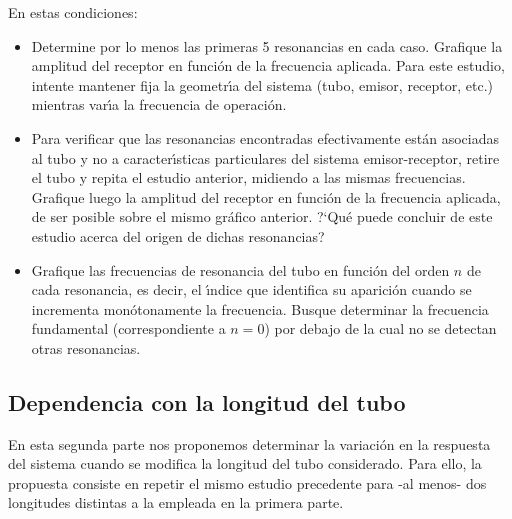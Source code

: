 \documentclass[laboratorio]{guia}
\begin{document}
En estas condiciones:
\begin{itemize}
    \item Determine por lo menos las primeras 5 resonancias en cada caso.
        Grafique la amplitud del receptor en funci\'on de la frecuencia
        aplicada. Para este estudio, intente mantener fija la geometr\'\i a del
        sistema (tubo, emisor, receptor, etc.) mientras var\'\i a la frecuencia
        de operaci\'on.
    \item Para verificar que las resonancias encontradas efectivamente est\'an
        asociadas al tubo y no a caracter\'\i sticas particulares del sistema
        emisor-receptor, retire el tubo y repita el estudio anterior, midiendo
        a las mismas frecuencias. Grafique luego la amplitud del receptor en
        funci\'on de la frecuencia aplicada, de ser posible sobre el mismo
        gr\'afico anterior. ?`Qu\'e puede concluir de este estudio acerca del
        origen de dichas resonancias?
    \item Grafique las frecuencias de resonancia del tubo en funci\'on del
        orden $n$ de cada resonancia, es decir, el \'\i ndice que identifica su
        aparici\'on cuando se incrementa mon\'otonamente la frecuencia. Busque
        determinar la frecuencia fundamental (correspondiente a $n=0$) por
        debajo de la cual no se detectan otras resonancias.
\end{itemize}


\subsection{Dependencia con la longitud del tubo}

En esta segunda parte nos proponemos determinar la variaci\'on en la respuesta
del sistema cuando se modifica la longitud del tubo considerado. Para ello, la
propuesta consiste en repetir el mismo estudio precedente para -al menos- dos
longitudes distintas a la empleada en la primera parte.
\end{document}
